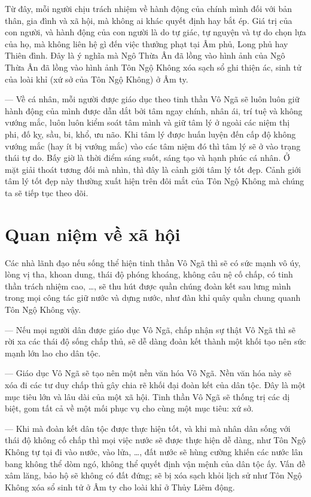 Từ đây, mỗi người chịu trách nhiệm về hành động của chính mình đối với bản thân, gia đình và xã hội, mà không ai khác quyết định hay bắt ép. Giá trị của con người, và hành động của con người là do tự giác, tự nguyện và tự do chọn lựa của họ, mà không liên hệ gì đến việc thưởng phạt tại Âm phủ, Long phủ hay Thiên đình. Đây là ý nghĩa mà Ngô Thừa Ân đã lồng vào hình ảnh của Ngô Thừa Ân đã lồng vào hình ảnh Tôn Ngộ Không xóa sạch sổ ghi thiện ác, sinh tử của loài khỉ (xứ sở của Tôn Ngộ Không) ở Âm ty.

— Về cá nhân, mỗi người được giáo dục theo tinh thần Vô Ngã sẽ luôn luôn giữ hành động của mình được dẫn dắt bởi tâm ngay chính, nhân ái, trí tuệ và không vướng mắc, luôn luôn kiểm soát tâm mình và giữ tâm lý ở ngoài các niệm thị phi, đố kỵ, sầu, bi, khổ, ưu não. Khi tâm lý được huấn luyện đến cấp độ không vướng mắc (hay ít bị vướng mắc) vào các tâm niệm đó thì tâm lý sẽ ở vào trạng thái tự do. Bấy giờ là thời điểm sáng suốt, sáng tạo và hạnh phúc cá nhân. Ở mặt giải thoát tương đối mà nhìn, thì đây là cảnh giới tâm lý tốt đẹp. Cảnh giới tâm lý tốt đẹp này thường xuất hiện trên đôi mắt của Tôn Ngộ Không mà chúng ta sẽ tiếp tục theo dõi.


\section{Quan niệm về xã hội} %
\label{sec:3_xa_hoi}

Các nhà lãnh đạo nếu sống thể hiện tinh thần Vô Ngã thì sẽ có sức mạnh vô úy, lòng vị tha, khoan dung, thái độ phóng khoáng, không câu nệ cố chấp, có tinh thần trách nhiệm cao, \ldots, sẽ thu hút được quần chúng đoàn kết sau lưng mình trong mọi công tác giữ nước và dựng nước, như đàn khỉ quây quần chung quanh Tôn Ngộ Không vậy.

— Nếu mọi người dân được giáo dục Vô Ngã, chấp nhận sự thật Vô Ngã thì sẽ rời xa các thái độ sống chấp thủ, sẽ dễ dàng đoàn kết thành một khối tạo nên sức mạnh lớn lao cho dân tộc.

— Giáo dục Vô Ngã sẽ tạo nên một nền văn hóa Vô Ngã. Nền văn hóa này sẽ xóa đi các tư duy chấp thủ gây chia rẽ khối đại đoàn kết của dân tộc. Đây là một mục tiêu lớn và lâu dài của một xã hội. Tinh thần Vô Ngã sẽ thống trị các dị biệt, gom tất cả về một mối phục vụ cho cùng một mục tiêu: xứ sở.

— Khi mà đoàn kết dân tộc được thực hiện tốt, và khi mà nhân dân sống với thái độ không cố chấp thì mọi việc nước sẽ được thực hiện dễ dàng, như Tôn Ngộ Không tự tại đi vào nước, vào lửa, \ldots, đất nước sẽ hùng cường khiến các nước lân bang không thể dòm ngó, không thể quyết định vận mệnh của dân tộc ấy. Vấn đề xâm lăng, bảo hộ sẽ không có đất đứng; sẽ bị xóa sạch khỏi lịch sử như Tôn Ngộ Không xóa sổ sinh tử ở Âm ty cho loài khỉ ở Thủy Liêm động.


